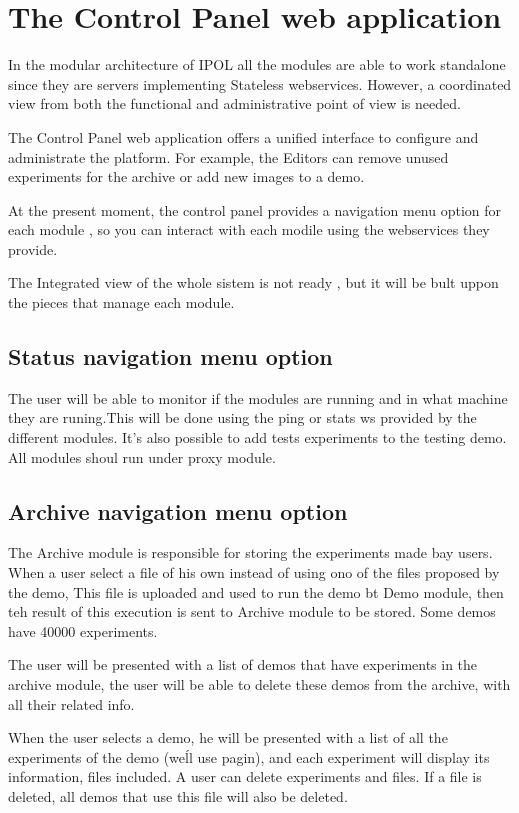 \section{The Control Panel web application}
In the modular architecture of IPOL all the modules are able to work standalone since they are servers implementing Stateless webservices. However, a coordinated view from both the functional and administrative point of view is needed.

The Control Panel web application offers a unified interface to configure and administrate the platform. For example, the Editors can remove unused experiments for the archive or add new images to a demo.

At the present moment, the control panel provides a navigation menu option for each module , 
so you can interact with each modile using the webservices they provide.

The Integrated view of the whole sistem is not ready , but it will be bult uppon the pieces that manage each module.

\subsection{Status navigation menu option}
The user will be able to monitor if the modules are running and in what machine they are runing.This will be done using the ping or stats ws provided by the different modules.
It's also possible to add tests experiments to the testing demo.
All modules shoul run under proxy module.

\subsection{Archive navigation menu option}
The Archive module is responsible for storing the experiments made bay users. When a user select a file of his own instead of using ono of the files proposed by the demo, This file is uploaded and used to run the demo bt Demo module, then teh result of this execution is sent to Archive module to be stored. Some demos have 40000 experiments.

The user will be presented with a list of demos that have experiments in the archive module, the user will be able to delete these demos from the archive, with all their related info.

When the user selects a demo, he will be presented with a list of all the experiments of the demo (we\'ll use pagin), and each experiment will display its information, files included. A user can delete experiments and files. If a file is deleted, all demos that use this file will also be deleted.


